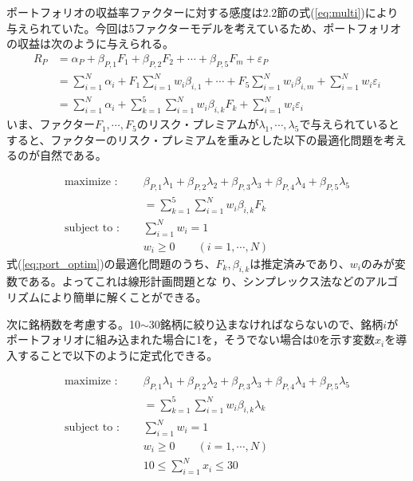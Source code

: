 \documentclass[11pt]{jreport}
\begin{document}
ポートフォリオの収益率ファクターに対する感度は2.2節の式(\ref{eq:multi})により与えられていた。今回は5ファクターモデルを考えているため、ポートフォリオの収益は次のように与えられる。
\begin{equation}
\begin{split}
R_P &= \alpha_P + \beta_{P,1} F_1 + \beta_{P,2} F_2 + \cdots + \beta_{P,5} F_m + \varepsilon_P\\
&=\sum_{i=1}^N \alpha_i + F_1 \sum_{i=1}^N w_i \beta_{i,1} + \cdots + F_5 \sum_{i=1}^N w_i \beta_{i,m} + \sum_{i=1}^N w_i\varepsilon_i\\
&= \sum_{i=1}^N \alpha_i + \sum_{k=1}^5 \sum_{i=1}^N w_i \beta_{i,k} F_k + \sum_{i=1}^N w_i\varepsilon_i
\label{eq:port}
\end{split}
\end{equation}
いま、ファクター$F_1,\cdots,F_5$のリスク・プレミアムが$\lambda_1,\cdots,\lambda_5$で与えられているとすると、ファクターのリスク・プレミアムを重みとした以下の最適化問題を考えるのが自然である。

\begin{equation}
\begin{split}
\text{maximize : }\quad & \beta_{P,1}\lambda_1 + \beta_{P,2}\lambda_2 + \beta_{P,3}\lambda_3 + \beta_{P,4}\lambda_4 + \beta_{P,5}\lambda_5\\
& = \sum_{k=1}^5 \sum_{i=1}^N w_i \beta_{i,k} F_k\\
\text{subject to : }\quad & \sum_{i=1}^N w_i = 1\\
& w_i \geq 0\qquad(i=1,\cdots,N)
\end{split}
\label{eq:port_optim}
\end{equation}
式(\ref{eq:port_optim})の最適化問題のうち、$F_k, \beta_{i,k}$は推定済みであり、$w_i$のみが変数である。よってこれは線形計画問題とな
り、シンプレックス法などのアルゴリズムにより簡単に解くことができる。

次に銘柄数を考慮する。10$\sim$30銘柄に絞り込まなければならないので、銘柄$i$がポートフォリオに組み込まれた場合に1を，そうでない場合は0を示す変数$x_i$を導入することで以下のように定式化できる。

\begin{equation}
\begin{split}
\text{maximize : }\quad & \beta_{P,1}\lambda_1 + \beta_{P,2}\lambda_2 + \beta_{P,3}\lambda_3 + \beta_{P,4}\lambda_4 + \beta_{P,5}\lambda_5\\
& = \sum_{k=1}^5 \sum_{i=1}^N w_i \beta_{i,k} \lambda_k\\
\text{subject to : }\quad & \sum_{i=1}^N w_i = 1\\
& w_i \geq 0\qquad(i=1,\cdots,N)\\
&10 \leq \sum_{i=1}^Nx_i \leq 30
\end{split}
\label{eq:port_optim}
\end{equation}
\end{document}
